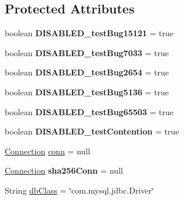 \subsection*{Protected Attributes}
\begin{DoxyCompactItemize}
\item 
\mbox{\label{classtestsuite_1_1_base_test_case_ab7e16b70df00394f5d55e8047c3c2471}} 
boolean {\bfseries D\+I\+S\+A\+B\+L\+E\+D\+\_\+test\+Bug15121} = true
\item 
\mbox{\label{classtestsuite_1_1_base_test_case_aade0f7a71cb88d5c263fffd13a9581ac}} 
boolean {\bfseries D\+I\+S\+A\+B\+L\+E\+D\+\_\+test\+Bug7033} = true
\item 
\mbox{\label{classtestsuite_1_1_base_test_case_aa0c548e48f82aa602ab584c833f083ca}} 
boolean {\bfseries D\+I\+S\+A\+B\+L\+E\+D\+\_\+test\+Bug2654} = true
\item 
\mbox{\label{classtestsuite_1_1_base_test_case_ad648618fb57db1d2bfcf8c789334513f}} 
boolean {\bfseries D\+I\+S\+A\+B\+L\+E\+D\+\_\+test\+Bug5136} = true
\item 
\mbox{\label{classtestsuite_1_1_base_test_case_ae901da5e006e157035ca0394e61d39b3}} 
boolean {\bfseries D\+I\+S\+A\+B\+L\+E\+D\+\_\+test\+Bug65503} = true
\item 
\mbox{\label{classtestsuite_1_1_base_test_case_a366ca14a4b36186f1e93966bff8ae923}} 
boolean {\bfseries D\+I\+S\+A\+B\+L\+E\+D\+\_\+test\+Contention} = true
\item 
\mbox{\hyperlink{interfacecom_1_1mysql_1_1jdbc_1_1_connection}{Connection}} \mbox{\hyperlink{classtestsuite_1_1_base_test_case_a51c71d14ae22c75fb285989cc78b4730}{conn}} = null
\item 
\mbox{\label{classtestsuite_1_1_base_test_case_a5bd183a70ffca96d160794ac4a6250a4}} 
\mbox{\hyperlink{interfacecom_1_1mysql_1_1jdbc_1_1_connection}{Connection}} {\bfseries sha256\+Conn} = null
\item 
String \mbox{\hyperlink{classtestsuite_1_1_base_test_case_ab78915f48e4a877fab1ace666b20f68a}{db\+Class}} = \char`\"{}com.\+mysql.\+jdbc.\+Driver\char`\"{}

\end{DoxyCompactItemize}
